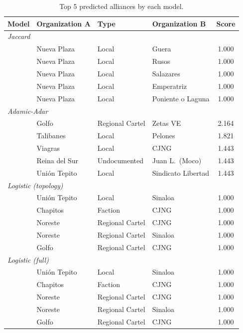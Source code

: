 \documentclass[11pt, a4paper]{article}
\begin{document}
\begin{table}[H]
\centering
\caption{Top 5 predicted alliances by each model.}
\label{tab:top5_all}
\small
\begin{tabular}{llllc}
\toprule
\textbf{Model} & \textbf{Organization A} & \textbf{Type} & \textbf{Organization B} & \textbf{Score} \\
\midrule
\multicolumn{5}{l}{\textit{Jaccard}} \\
& Nueva Plaza & Local & Guera & 1.000 \\
& Nueva Plaza & Local & Rusos & 1.000 \\
& Nueva Plaza & Local & Salazares & 1.000 \\
& Nueva Plaza & Local & Emperatriz & 1.000 \\
& Nueva Plaza & Local & Poniente o Laguna & 1.000 \\
\midrule
\multicolumn{5}{l}{\textit{Adamic-Adar}} \\
& Golfo & Regional Cartel & Zetas VE & 2.164 \\
& Talibanes & Local & Pelones & 1.821 \\
& Viagras & Local & CJNG & 1.443 \\
& Reina del Sur & Undocumented & Juan L.\ (Moco) & 1.443 \\
& Uni\'on Tepito & Local & Sindicato Libertad & 1.443 \\
\midrule
\multicolumn{5}{l}{\textit{Logistic (topology)}} \\
& Uni\'on Tepito & Local & Sinaloa & 1.000 \\
& Chapitos & Faction & CJNG & 1.000 \\
& Noreste & Regional Cartel & CJNG & 1.000 \\
& Noreste & Regional Cartel & Sinaloa & 1.000 \\
& Golfo & Regional Cartel & CJNG & 1.000 \\
\midrule
\multicolumn{5}{l}{\textit{Logistic (full)}} \\
& Uni\'on Tepito & Local & Sinaloa & 1.000 \\
& Chapitos & Faction & CJNG & 1.000 \\
& Noreste & Regional Cartel & CJNG & 1.000 \\
& Noreste & Regional Cartel & Sinaloa & 1.000 \\
& Golfo & Regional Cartel & CJNG & 1.000 \\
\bottomrule
\end{tabular}
\end{table}
\end{document}
